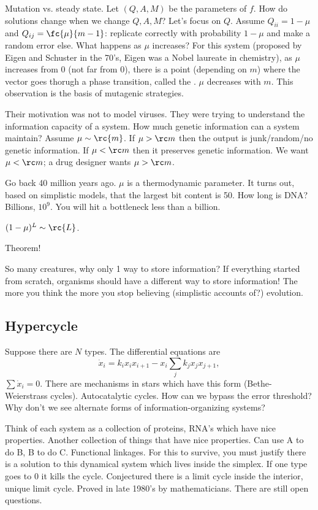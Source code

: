 Mutation vs. steady state.
Let $(Q,A,M)$ be the parameters of $f$. How do solutions change when we change $Q,A,M$? Let's focus on $Q$. Assume $Q_{ii}=1-\mu$ and $Q_{ij}=\fc{\mu}{m-1}$: replicate correctly with probability $1-\mu$ and make a random error else. 
What happens as $\mu$ increases?
For this system (proposed by Eigen and Schuster in the 70's, Eigen was a Nobel laureate in chemistry), as $\mu$ increases from 0 (not far from 0), there is a point (depending on $m$) where the vector goes thorugh a phase transition, called the . 
$\mu$ decreases with $m$. This observation is the basis of mutagenic strategies.

Their motivation was not to model viruses. They were trying to understand the information capacity of a system. How much genetic information can a system maintain? Assume $\mu \sim \rc{m}$. %
If $\mu>\rc m$ then the output is junk/random/no genetic information. If $\mu<\rc m$ then it preserves genetic information. We want $\mu<\rc m$; a drug designer wants $\mu>\rc m$. 

Go back 40 million years ago. $\mu$ is a thermodynamic parameter. It turns out, based on simplistic models, that the largest bit content is 50. How long is DNA? Billions, $10^9$. You will hit a bottleneck less than a billion. %

$(1-\mu)^L\sim \rc{L}$. 

Theorem!

So many creatures, why only 1 way to store information? If everything started from scratch, organisms should have a different way to store information! The more you think the more you stop believing (simplistic accounts of?) evolution.

\subsection{Hypercycle}


Suppose there are $N$ types. The differential equations are 
\[
\dot{x}_i= k_ix_ix_{i+1} - x_i\sum_j k_jx_jx_{j+1},
\]
$\sum \dot{x}_i=0$.
There are mechanisms in stars which have this form (Bethe-Weierstrass cycles). Autocatalytic cycles. 
How can we bypass the error threshold? Why don't we see alternate forms of information-organizing systems?

Think of each system as a collection of proteins, RNA's which have nice properties. Another collection of things that have nice properties. Can use A to do B, B to do C. Functional linkages. For this to survive, you must justify there is a solution to this dynamical system which lives inside the simplex. If one type goes to 0 it kills the cycle. Conjectured there is a limit cycle inside the interior, unique limit cycle. Proved in late 1980's by mathematicians. There are still open questions.

